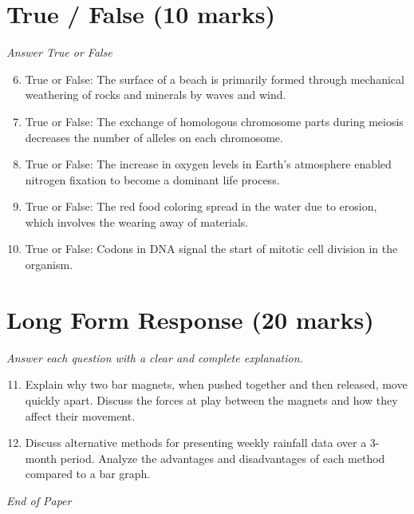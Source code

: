 \documentclass[12pt]{article}
\begin{document}
\section*{True / False (10 marks)}
\textit{Answer True or False}
\begin{enumerate}[label=\arabic*.]
\setcounter{enumi}{5}
\item True or False: The surface of a beach is primarily formed through mechanical weathering of rocks and minerals by waves and wind.
\item True or False: The exchange of homologous chromosome parts during meiosis decreases the number of alleles on each chromosome.
\item True or False: The increase in oxygen levels in Earth's atmosphere enabled nitrogen fixation to become a dominant life process.
\item True or False: The red food coloring spread in the water due to erosion, which involves the wearing away of materials.
\item True or False: Codons in DNA signal the start of mitotic cell division in the organism.
\end{enumerate}

\section*{Long Form Response (20 marks)}
\textit{Answer each question with a clear and complete explanation.}
\begin{enumerate}[label=\arabic*.]
\setcounter{enumi}{10}
\item Explain why two bar magnets, when pushed together and then released, move quickly apart.
Discuss the forces at play between the magnets and how they affect their movement.
\item Discuss alternative methods for presenting weekly rainfall data over a 3-month period.
Analyze the advantages and disadvantages of each method compared to a bar graph.
\end{enumerate}

\vfill
\noindent\textit{End of Paper}
\end{document}
